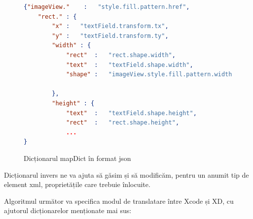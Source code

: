 \begin{figure}[!htbp]
\begin{lstlisting}[language=json,firstnumber=1]
{"imageView."    :   "style.fill.pattern.href",
    "rect." : {
        "x" :   "textField.transform.tx",
        "y" :   "textField.transform.ty",
        "width" : {
            "rect"  :   "rect.shape.width",
            "text"  :   "textField.shape.width",
            "shape" :   "imageView.style.fill.pattern.width"
        
        },
        "height" : {
            "text"  :   "textField.shape.height",
            "rect"  :   "rect.shape.height",
            ...
}
\end{lstlisting}
\caption{Dicționarul mapDict în format json} \label{fig:MapDict Schema}
\end{figure}

Dicționarul invers ne va ajuta să găsim și să modificăm, pentru un anumit tip de element xml, proprietățile care trebuie înlocuite. 

Algoritmul următor va specifica modul de translatare între Xcode și XD, cu ajutorul dicționarelor menționate mai sus:

